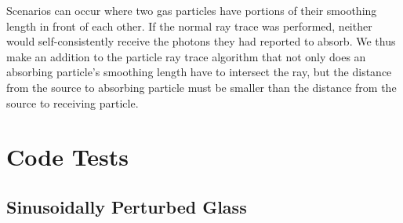 \documentclass[fleq,usenatbib]{mnras}
\begin{document}
Scenarios can occur where two gas particles have portions of their smoothing 
length in front of each other. If the normal ray trace was performed, neither 
would self-consistently receive the photons they had reported to absorb. We 
thus make an addition to the particle ray trace algorithm that not only does 
an absorbing particle's smoothing length have to intersect the ray, but the 
distance from the source to absorbing particle must be smaller than the 
distance from the source to receiving particle.

\section{Code Tests}\label{sec:tsts}
\subsection{Sinusoidally Perturbed Glass}
\end{document}
